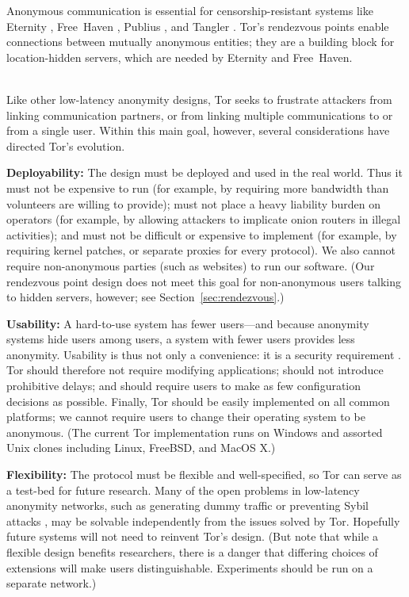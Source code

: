 \documentclass[times,10pt,twocolumn]{article}
\begin{document}
Anonymous communication is essential for censorship-resistant
systems like Eternity \cite{eternity}, Free~Haven \cite{freehaven-berk},
Publius \cite{publius}, and Tangler \cite{tangler}. Tor's rendezvous
points enable connections between mutually anonymous entities; they
are a building block for location-hidden servers, which are needed by
Eternity and Free~Haven.


\label{sec:assumptions}

\\
Like other low-latency anonymity designs, Tor seeks to frustrate
attackers from linking communication partners, or from linking
multiple communications to or from a single user.  Within this
main goal, however, several considerations have directed
Tor's evolution.

\textbf{Deployability:} The design must be deployed and used in the
real world.  Thus it
must not be expensive to run (for example, by requiring more bandwidth
than volunteers are willing to provide); must not place a heavy
liability burden on operators (for example, by allowing attackers to
implicate onion routers in illegal activities); and must not be
difficult or expensive to implement (for example, by requiring kernel
patches, or separate proxies for every protocol).  We also cannot
require non-anonymous parties (such as websites)
to run our software.  (Our rendezvous point design does not meet
this goal for non-anonymous users talking to hidden servers,
however; see Section~\ref{sec:rendezvous}.)

\textbf{Usability:} A hard-to-use system has fewer users---and because
anonymity systems hide users among users, a system with fewer users
provides less anonymity.  Usability is thus not only a convenience:
it is a security requirement \cite{econymics,back01}. Tor should
therefore not
require modifying applications; should not introduce prohibitive delays;
and should require users to make as few configuration decisions
as possible.  Finally, Tor should be easily implemented on all common
platforms; we cannot require users to change their operating system
to be anonymous.  (The current Tor implementation runs on Windows and
assorted Unix clones including Linux, FreeBSD, and MacOS X.)

\textbf{Flexibility:} The protocol must be flexible and well-specified,
so Tor can serve as a test-bed for future research.
Many of the open problems in low-latency anonymity
networks, such as generating dummy traffic or preventing Sybil attacks
\cite{sybil}, may be solvable independently from the issues solved by
Tor. Hopefully future systems will not need to reinvent Tor's design.
(But note that while a flexible design benefits researchers,
there is a danger that differing choices of extensions will make users
distinguishable. Experiments should be run on a separate network.)
\end{document}
